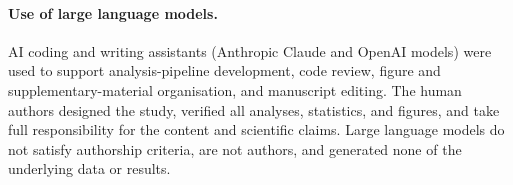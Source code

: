 \paragraph{Use of large language models.}
AI coding and writing assistants (Anthropic Claude and OpenAI models) were used
to support analysis-pipeline development, code review, figure and
supplementary-material organisation, and manuscript editing. The human authors
designed the study, verified all analyses, statistics, and figures, and take
full responsibility for the content and scientific claims. Large language models
do not satisfy authorship criteria, are not authors, and generated none of the
underlying data or results.
